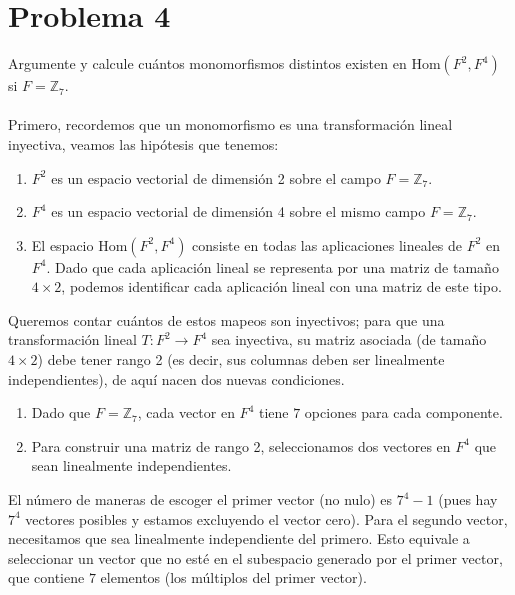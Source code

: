 \documentclass{article}
\begin{document}
\section*{Problema 4}

Argumente y calcule cuántos monomorfismos distintos existen en \( \text{Hom} \left( F^2, F^4 \right) \) si \( F = \mathbb{Z}_7 \).\\\\

Primero, recordemos que un monomorfismo es una transformación lineal inyectiva, veamos las hipótesis que tenemos:

\begin{enumerate}
\item \( F^2 \) es un espacio vectorial de dimensión 2 sobre el campo \( F = \mathbb{Z}_7 \).
\item \( F^4 \) es un espacio vectorial de dimensión 4 sobre el mismo campo \( F = \mathbb{Z}_7 \).
\item El espacio \( \text{Hom}(F^2, F^4) \) consiste en todas las aplicaciones lineales de \( F^2 \) en \( F^4 \). Dado que cada aplicación lineal se representa por una matriz de tamaño \( 4 \times 2 \), podemos identificar cada aplicación lineal con una matriz de este tipo.
\end{enumerate}

Queremos contar cuántos de estos mapeos son inyectivos; para que una transformación lineal \( T : F^2 \rightarrow F^4 \) sea inyectiva, su matriz asociada (de tamaño \( 4 \times 2 \)) debe tener rango 2 (es decir, sus columnas deben ser linealmente independientes), de aquí nacen dos nuevas condiciones.

\begin{enumerate}
\item Dado que \( F = \mathbb{Z}_7 \), cada vector en \( F^4 \) tiene \( 7 \) opciones para cada componente.
\item Para construir una matriz de rango 2, seleccionamos dos vectores en \( F^4 \) que sean linealmente independientes.
\end{enumerate}

El número de maneras de escoger el primer vector (no nulo) es \( 7^4 - 1 \) (pues hay \( 7^4 \) vectores posibles y estamos excluyendo el vector cero). Para el segundo vector, necesitamos que sea linealmente independiente del primero. Esto equivale a seleccionar un vector que no esté en el subespacio generado por el primer vector, que contiene \( 7 \) elementos (los múltiplos del primer vector).
\end{document}
